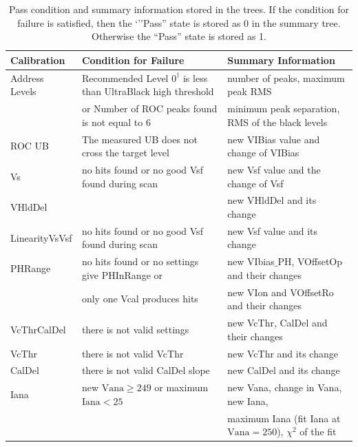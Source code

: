 \begin{table}[htbp]
   \centering
\tiny{
    \caption{Pass condition and summary information stored in the trees. If the condition for failure is satisfied, then the `''Pass'' state is stored as 0 in the summary tree. Otherwise the ``Pass'' state is stored as 1.}
   \label{treeinformation}
  \begin{center}
 \begin{tabular}{lll}
 \hline \hline
 Calibration & Condition for Failure& Summary Information \\
   \hline
 Address Levels & Recommended Level $0^{\dagger}$ is less than UltraBlack high threshold &
 number of peaks, maximum peak RMS\\
  & or Number of ROC peaks found is not equal to $6$ & minimum peak separation, RMS of the black levels
 \\ \hline
ROC UB & The measured UB does not cross the target level &
 new VIBias value and change of VIBias \\ \hline
Vs & no hits found or no good Vsf found during scan &
 new Vsf value and the change of Vsf \\
 VHldDel &  &
 new VHldDel and its change \\ \hline 
LinearityVsVsf & no hits found or no good Vsf found during scan &
 new Vsf value and its change \\ \hline
PHRange & no hits found or no settings give PHInRange or &
 new VIbias$\_$PH, VOffsetOp and their changes \\
 & only one Vcal produces hits & new VIon and VOffsetRo and their changes \\ \hline
VcThrCalDel & there is not valid settings &  new VcThr, CalDel and their changes \\ \hline
VcThr & there is not valid VcThr &  new VcThr and its change \\ \hline
CalDel & there is not valid CalDel slope & new CalDel and its change \\ \hline 
Iana & new $\mathrm{Vana} \geq 249$ or maximum $\mathrm{Iana} < 25$ & new Vana, change in Vana, new Iana, \\
& & maximum Iana (fit Iana at $\mathrm{Vana}=250$), $\chi^2$ of the fit \\
\hline \hline
\end{tabular}
 \end{center}
}
 \end{table}


